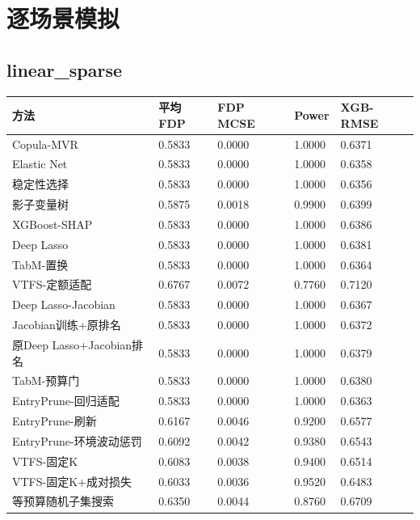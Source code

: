 \documentclass[UTF8,11pt,a4paper]{ctexart}
\begin{document}
\section{逐场景模拟}\label{ux9010ux573aux666fux6a21ux62df}

\subsection{linear\_sparse}\label{linear_sparse}

{\def\LTcaptype{none} %
{
\footnotesize
\begin{longtable}[]{@{}lllll@{}}
\toprule\noalign{}
方法 & 平均FDP & FDP MCSE & Power & XGB-RMSE \\
\midrule\noalign{}
\endhead
\bottomrule\noalign{}
\endlastfoot
Copula-MVR & 0.5833 & 0.0000 & 1.0000 & 0.6371 \\
Elastic Net & 0.5833 & 0.0000 & 1.0000 & 0.6358 \\
稳定性选择 & 0.5833 & 0.0000 & 1.0000 & 0.6356 \\
影子变量树 & 0.5875 & 0.0018 & 0.9900 & 0.6399 \\
XGBoost-SHAP & 0.5833 & 0.0000 & 1.0000 & 0.6386 \\
Deep Lasso & 0.5833 & 0.0000 & 1.0000 & 0.6381 \\
TabM-置换 & 0.5833 & 0.0000 & 1.0000 & 0.6364 \\
VTFS-定额适配 & 0.6767 & 0.0072 & 0.7760 & 0.7120 \\
Deep Lasso-Jacobian & 0.5833 & 0.0000 & 1.0000 & 0.6367 \\
Jacobian训练+原排名 & 0.5833 & 0.0000 & 1.0000 & 0.6372 \\
原Deep Lasso+Jacobian排名 & 0.5833 & 0.0000 & 1.0000 & 0.6379 \\
TabM-预算门 & 0.5833 & 0.0000 & 1.0000 & 0.6380 \\
EntryPrune-回归适配 & 0.5833 & 0.0000 & 1.0000 & 0.6363 \\
EntryPrune-刷新 & 0.6167 & 0.0046 & 0.9200 & 0.6577 \\
EntryPrune-环境波动惩罚 & 0.6092 & 0.0042 & 0.9380 & 0.6543 \\
VTFS-固定K & 0.6083 & 0.0038 & 0.9400 & 0.6514 \\
VTFS-固定K+成对损失 & 0.6033 & 0.0036 & 0.9520 & 0.6483 \\
等预算随机子集搜索 & 0.6350 & 0.0044 & 0.8760 & 0.6709 \\
\end{longtable}
}
}
\end{document}
